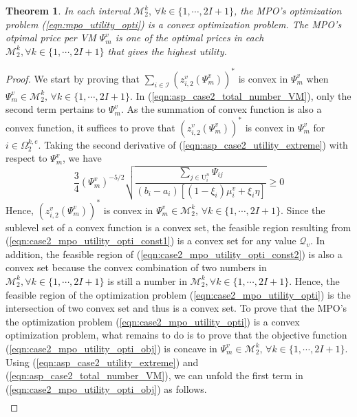 \documentclass[conference]{IEEEtran}
\newtheorem{theorem}{Theorem}
\begin{document}
\begin{theorem}\label{thm:mpo_case2_convex_optimization}
In each interval $\mathcal{M}_2^k,\, \forall k \in \{1, \cdots, 2I+1\}$, the MPO's optimization problem (\ref{eqn:mpo_utility_opti}) is a convex optimization problem. The MPO's otpimal price per VM $\Psi_m^v$ is one of the optimal prices in each $\mathcal{M}_2^k, \forall k \in \{1, \cdots, 2I+1\}$ that gives the highest utility.
\end{theorem}
\begin{proof}
We start by proving that $\sum_{i \in \mathcal{I}} (z_{i,2}^v(\Psi_m^v))^*$ is convex in $\Psi_m^v$ when $\Psi_m^v \in \mathcal{M}_2^k,\, \forall k \in \{1, \cdots, 2I+1\}$. In (\ref{eqn:asp_case2_total_number_VM}), only the second term pertains to $\Psi_m^v$. As the summation of convex function is also a convex function, it suffices to prove that $(z_{i,2}^v(\Psi_m^v))^*$ is convex in $\Psi_m^v$ for $i \in \Omega_2^{k,e}$. Taking the second derivative of (\ref{eqn:asp_case2_utility_extreme}) with respect to $\Psi_m^v$, we have 
\begin{equation}
\frac{3}{4}(\Psi_m^v)^{-5/2}\sqrt{\frac{\sum_{j \in \mathrm{U}_i^n}\Psi_{ij}}{(b_i-a_i)[(1-\xi_i)\mu_i^v + \xi_i \eta]}} \geq 0
\end{equation}
Hence, $(z_{i,2}^v(\Psi_m^v))^*$ is convex in $\Psi_m^v \in \mathcal{M}_2^k,\, \forall k \in \{1, \cdots, 2I+1\}$. Since the sublevel set of a convex function is a convex set, the feasible region resulting from (\ref{eqn:case2_mpo_utility_opti_const1}) is a convex set for any value $\mathcal{Q}_v$. In addition, the feasible region of (\ref{eqn:case2_mpo_utility_opti_const2}) is also a convex set because the convex combination of two numbers in $\mathcal{M}_2^k, \forall k \in \{1, \cdots, 2I+1\}$ is still a number in $\mathcal{M}_2^k, \forall k \in \{1, \cdots, 2I+1\}$. Hence, the feasible region of the optimization problem (\ref{eqn:case2_mpo_utility_opti}) is the intersection of two convex set and thus is a convex set. To prove that the MPO's the optimization problem (\ref{eqn:case2_mpo_utility_opti}) is a convex optimization problem, what remains to do is to prove that the objective function (\ref{eqn:case2_mpo_utility_opti_obj}) is concave in $\Psi_m^v \in \mathcal{M}_2^k,\, \forall k \in \{1, \cdots, 2I+1\}$. Using (\ref{eqn:asp_case2_utility_extreme}) and (\ref{eqn:asp_case2_total_number_VM}), we can unfold the first term in (\ref{eqn:case2_mpo_utility_opti_obj}) as follows. 
\begin{align} \label{eqn:mpo_case2_utility_first_term}

\end{align}
\end{proof}
\end{document}
